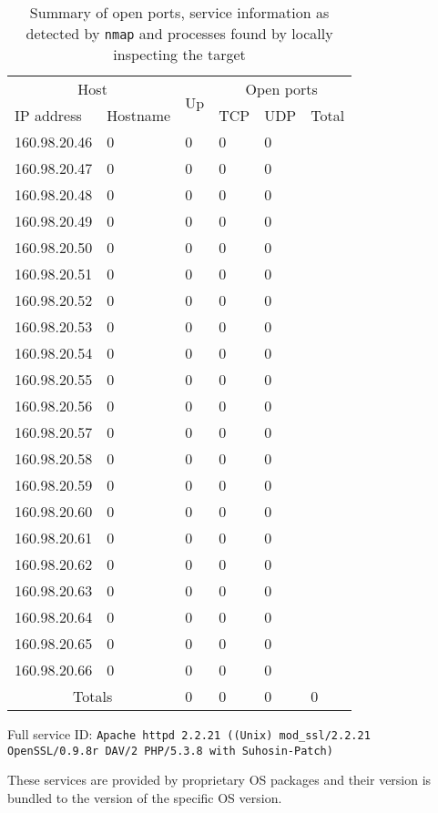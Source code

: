 \documentclass[10pt,a4paper,twoside,onecolumn]{article}
\begin{document}
\begin{table}
\begin{threeparttable}[b]
\begin{tabularx}{\textwidth}{ l | X | l | l l l }
\toprule


\multicolumn{2}{c|}{Host} &
\multirow{2}{*}{Up} &
\multicolumn{3}{c}{Open ports} \\
\cline{1-2} \cline{4-6}
IP address & Hostname & & TCP & UDP & Total \\
\hline

160.98.20.46 & 0 & 0 & 0 & 0 \\
160.98.20.47 & 0 & 0 & 0 & 0 \\
160.98.20.48 & 0 & 0 & 0 & 0 \\
160.98.20.49 & 0 & 0 & 0 & 0 \\
160.98.20.50 & 0 & 0 & 0 & 0 \\
160.98.20.51 & 0 & 0 & 0 & 0 \\
160.98.20.52 & 0 & 0 & 0 & 0 \\
160.98.20.53 & 0 & 0 & 0 & 0 \\
160.98.20.54 & 0 & 0 & 0 & 0 \\
160.98.20.55 & 0 & 0 & 0 & 0 \\
160.98.20.56 & 0 & 0 & 0 & 0 \\
160.98.20.57 & 0 & 0 & 0 & 0 \\
160.98.20.58 & 0 & 0 & 0 & 0 \\
160.98.20.59 & 0 & 0 & 0 & 0 \\
160.98.20.60 & 0 & 0 & 0 & 0 \\
160.98.20.61 & 0 & 0 & 0 & 0 \\
160.98.20.62 & 0 & 0 & 0 & 0 \\
160.98.20.63 & 0 & 0 & 0 & 0 \\
160.98.20.64 & 0 & 0 & 0 & 0 \\
160.98.20.65 & 0 & 0 & 0 & 0 \\
160.98.20.66 & 0 & 0 & 0 & 0 \\
\hline

\multicolumn{2}{c|}{Totals} & 0 & 0 & 0 & 0 \\


\bottomrule
\end{tabularx}

\begin{tablenotes}
	\item[1] Full service ID: \texttt{Apache httpd 2.2.21 ((Unix) mod\_ssl/2.2.21 OpenSSL/0.9.8r DAV/2 PHP/5.3.8 with Suhosin-Patch)}
	\item[2] These services are provided by proprietary OS packages and their version is bundled to the version of the specific OS version.
\end{tablenotes}

\caption{Summary of open ports, service information as detected by \texttt{nmap} and processes found by locally inspecting the target}
\label{tab:report}
\end{threeparttable}
\end{table}
\end{document}
